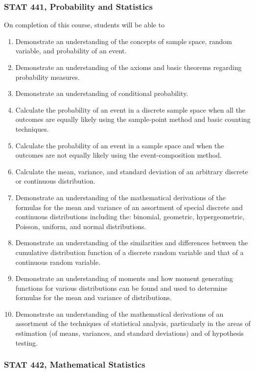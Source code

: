 \documentclass[11pt]{article}
\newenvironment{alphalist}{
\begin{enumerate}[label=(\arabic*),widest=107 ,leftmargin=25pt, itemsep=0pt]}
{\end{enumerate}}
\begin{document}
\subsubsection{STAT 441, Probability and Statistics}

On completion of this course, students will be able to
\begin{alphalist}
	\item Demonstrate an understanding of the concepts of sample space, random variable, and probability of an event.
	\item Demonstrate an understanding of the axioms and basic theorems regarding probability measures.
	\item Demonstrate an understanding of conditional probability.
	\item Calculate the probability of an event in a discrete sample space when all the outcomes are equally likely using the sample-point method and basic counting techniques.
	\item Calculate the probability of an event in a sample space and when the outcomes are not equally likely using the event-composition method.
	\item Calculate the mean, variance, and standard deviation of an arbitrary discrete or continuous distribution.
	\item Demonstrate an understanding of the mathematical derivations of the formulas for the mean and variance of an assortment of special discrete and continuous distributions including the: binomial, geometric, hypergeometric, Poisson, uniform, and normal distributions.
	\item Demonstrate an understanding of the similarities and differences between the cumulative distribution function of a discrete random variable and that of a continuous random variable.
	\item Demonstrate an understanding of moments and how moment generating functions for various distributions can be found and used to determine formulas for the mean and variance of distributions.
	\item Demonstrate an understanding of the mathematical derivations of an assortment of the techniques of statistical analysis, particularly in the areas of estimation (of means, variances, and standard deviations) and of hypothesis testing.
\end{alphalist}
\subsubsection{STAT 442, Mathematical Statistics}
\end{document}
